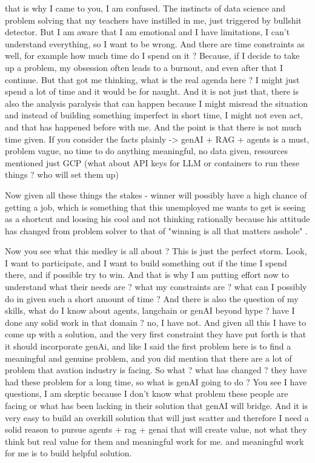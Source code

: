 that is why I came to you, I am confused. The instincts of data science and problem solving that my teachers have instilled in me, just triggered by bullshit detector. But I am aware that I am emotional and I have limitations, I can't understand everything, so I want to be wrong. And there are time constraints as well, for example how much time do I spend on it ? Because, if I decide to take up a problem, my obsession often leads to a burnout, and even after that I continue. But that got me thinking, what is the real agenda here ? I might just spend a lot of time and it would be for naught. And it is not just that, there is also the analysis paralysis that can happen because I might misread the situation and instead of building something imperfect in short time, I might not even act, and that has happened before with me. And the point is that there is not much time given. If you consider the facts plainly -> genAI + RAG + agents is a must, problem vague, no time to do anything meaningful, no data given, resources mentioned just GCP (what about API keys for LLM or containers to run these things ? who will set them up)

Now given all these things the stakes - winner will possibly have a high chance of getting a job, which is something that this unemployed me wants to get is seeing as a shortcut and loosing his cool and not thinking rationally because his attitude has changed from problem solver to that of "winning is all that matters asshole" .

Now you see what this medley is all about ? This is just the perfect storm. Look, I want to participate, and I want to build something out if the time I spend there, and if possible try to win. And that is why I am putting effort now to understand what their needs are ? what my constraints are ? what can I possibly do in given such a short amount of time ? And there is also the question of my skills, what do I know about agents, langchain or genAI beyond hype ? have I done any solid work in that domain ? no, I have not. And given all this I have to come up with a solution, and the very first constraint they have put forth is that it should incorporate genAi, and like I said the first problem here is to find a meaningful and genuine problem, and you did mention that there are a lot of problem that avation industry is facing. So what ? what has changed ? they have had these problem for a long time, so what is genAI going to do ? You see I have questions, I am skeptic because I don't know what problem these people are facing or what has been lacking in their solution that genAI will bridge. And it is very easy to build an overkill solution that will just scatter and therefore I need a solid reason to pursue agents + rag + genai that will create value, not what they think but real value for them and meaningful work for me. and meaningful work for me is to build helpful solution.

